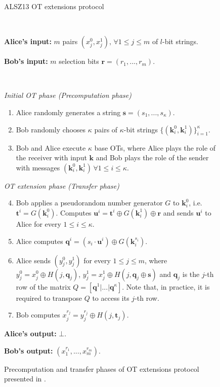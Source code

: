 \begin{figure}[t]
    \centering
        \begin{tcolorbox}
                        
			\centerline{ALSZ13 OT extensions protocol \citep{ALSZ13}}
            
			\ 

			\textbf{Alice's input:} $m$ pairs $(x^0_j, x^1_j),\, \forall 1\leq j\leq m$ of $l$-bit strings.
            
			\textbf{Bob's input:} $m$ selection bits $\bm{r} = (r_1, ..., r_m)$.

			\
			
			\textit{Initial OT phase (Precomputation phase)}
    \begin{enumerate}
         \item Alice randomly generates a string $\bm{s} = (s_1, ..., s_\kappa)$.
         \item Bob randomly chooses $\kappa$ pairs of $\kappa$-bit strings $\{(\bm{k}^0_i, \bm{k}^1_i)\}^\kappa_{i=1}$.
         \item Bob and Alice execute $\kappa$ base OTs, where Alice plays the role of the receiver with input $\bm{k}$ and Bob plays the role of the sender with messages $(\bm{k}^0_i, \bm{k}^1_i)\, \forall 1\leq i\leq \kappa$.
    \end{enumerate}
    \textit{OT extension phase (Transfer phase)}
    \begin{enumerate}
    \setcounter{enumi}{3}
        \item Bob applies a pseudorandom number generator $G$ to $\bm{k}^0_i$, i.e. $\bm{t}^i = G(\bm{k}^0_i)$. Computes $\bm{u}^i = \bm{t}^i \oplus G(\bm{k}^1_i) \oplus \bm{r}$ and sends $\bm{u}^i$ to Alice for every $1\leq i\leq \kappa$.
        \item Alice computes $\bm{q}^i = (s_i \cdot \bm{u}^i) \oplus G(\bm{k}^{s_i}_i)$.
        \item Alice sends $(y^0_j, y^1_j)$ for every $1\leq j\leq m$, where $y^0_j = x^0_j\oplus H(j,\bm{q}_j)$, $y^1_j = x^1_j\oplus H(j,\bm{q}_j\oplus \bm{s})$ and $\bm{q}_j$ is the $j$-th row of the matrix $Q = [ \bm{q}^1 | ...| \bm{q}^\kappa]$. Note that, in practice, it is required to transpose $Q$ to access its $j$-th row.
        \item Bob computes $x^{r_j}_j = y^{r_j}_j \oplus H(j, \bm{t}_j)$.
    \end{enumerate} 
    
				\textbf{Alice's output:} $\bot$.
    
				\textbf{Bob's output:} $(x^{r_1}_1, ..., x^{r_m}_m)$.

        
        \end{tcolorbox}
    \caption{Precomputation and transfer phases of OT extensions protocol presented in \cite{ALSZ13}.}
    \label{fig:ALSZ13Protocol}
\end{figure}

